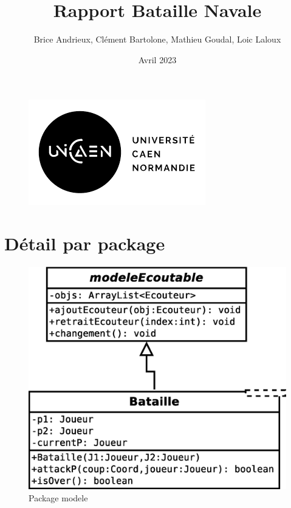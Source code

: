 \documentclass{article}
\title{Rapport Bataille Navale}
\author{Brice Andrieux, Clément Bartolone, Mathieu Goudal, Loic Laloux}
\date{Avril 2023}
\begin{document}
\maketitle

    \begin{figure}[htp]
        \centering
        \includegraphics[scale=1]{images/BatailleNavale/unicaen.png}
    \end{figure}
    \newpage
    \tableofcontents
    \newpage




%
%


\newpage

\section{Détail par package}
\begin{figure}[htp]
\centering
\includegraphics[scale=0.45]{images/Diagramme/package_modele.eps}
\caption{\label{fig:Modele}Package modele}
  
\end{figure}
\end{document}
